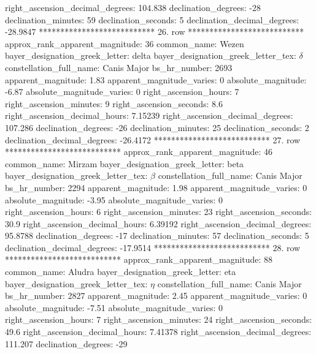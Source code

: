    right_ascension_decimal_degrees: 104.838
               declination_degrees: -28
               declination_minutes: 59
               declination_seconds: 5
       declination_decimal_degrees: -28.9847
*************************** 26. row ***************************
    approx_rank_apparent_magnitude: 36
                       common_name: Wezen
    bayer_designation_greek_letter: delta
bayer_designation_greek_letter_tex: $\delta$
           constellation_full_name: Canis Major
                      bs_hr_number: 2693
                apparent_magnitude: 1.83
         apparent_magnitude_varies: 0
                absolute_magnitude: -6.87
         absolute_magnitude_varies: 0
             right_ascension_hours: 7
           right_ascension_minutes: 9
           right_ascension_seconds: 8.6
     right_ascension_decimal_hours: 7.15239
   right_ascension_decimal_degrees: 107.286
               declination_degrees: -26
               declination_minutes: 25
               declination_seconds: 2
       declination_decimal_degrees: -26.4172
*************************** 27. row ***************************
    approx_rank_apparent_magnitude: 46
                       common_name: Mirzam
    bayer_designation_greek_letter: beta
bayer_designation_greek_letter_tex: $\beta$
           constellation_full_name: Canis Major
                      bs_hr_number: 2294
                apparent_magnitude: 1.98
         apparent_magnitude_varies: 0
                absolute_magnitude: -3.95
         absolute_magnitude_varies: 0
             right_ascension_hours: 6
           right_ascension_minutes: 23
           right_ascension_seconds: 30.9
     right_ascension_decimal_hours: 6.39192
   right_ascension_decimal_degrees: 95.8788
               declination_degrees: -17
               declination_minutes: 57
               declination_seconds: 5
       declination_decimal_degrees: -17.9514
*************************** 28. row ***************************
    approx_rank_apparent_magnitude: 88
                       common_name: Aludra
    bayer_designation_greek_letter: eta
bayer_designation_greek_letter_tex: $\eta$
           constellation_full_name: Canis Major
                      bs_hr_number: 2827
                apparent_magnitude: 2.45
         apparent_magnitude_varies: 0
                absolute_magnitude: -7.51
         absolute_magnitude_varies: 0
             right_ascension_hours: 7
           right_ascension_minutes: 24
           right_ascension_seconds: 49.6
     right_ascension_decimal_hours: 7.41378
   right_ascension_decimal_degrees: 111.207
               declination_degrees: -29
